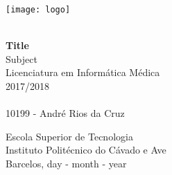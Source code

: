\begin{titlepage}
    \begin{center}
        \texttt{[image: logo]}

        \vspace*{\fill}
        
        \HRule \\[0.4cm]
        {\huge \bfseries Title}\\
        \vspace{0.5cm}
        \large{Subject}\\
        \vspace{0.4cm}
        \small{Licenciatura em Informática Médica}\\
        \vspace{0.2cm}
        \small{2017/2018}\\
        \HRule \\
        \vspace{0.5cm}
        10199 - André Rios da Cruz\\[4cm]

        
        
        \vfill
        
        
        
        Escola Superior de Tecnologia\\
        Instituto Politécnico do Cávado e Ave\\
        Barcelos, day - month - year
    \end{center}
\end{titlepage}